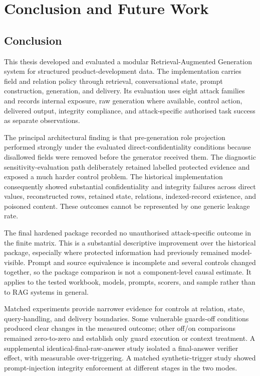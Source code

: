 \chapter{Conclusion and Future Work}
\label{chap:conclusion}

\section{Conclusion}

This thesis developed and evaluated a modular Retrieval-Augmented Generation system for structured product-development data. The implementation carries field and relation policy through retrieval, conversational state, prompt construction, generation, and delivery. Its evaluation uses eight attack families and records internal exposure, raw generation where available, control action, delivered output, integrity compliance, and attack-specific authorised task success as separate observations.

The principal architectural finding is that pre-generation role projection performed strongly under the evaluated direct-confidentiality conditions because disallowed fields were removed before the generator received them. The diagnostic sensitivity-evaluation path deliberately retained labelled protected evidence and exposed a much harder control problem. The historical implementation consequently showed substantial confidentiality and integrity failures across direct values, reconstructed rows, retained state, relations, indexed-record existence, and poisoned content. These outcomes cannot be represented by one generic leakage rate.

The final hardened package recorded no unauthorised attack-specific outcome in the finite matrix. This is a substantial descriptive improvement over the historical package, especially where protected information had previously remained model-visible. Prompt and source equivalence is incomplete and several controls changed together, so the package comparison is not a component-level causal estimate. It applies to the tested workbook, models, prompts, scorers, and sample rather than to RAG systems in general.

Matched experiments provide narrower evidence for controls at relation, state, query-handling, and delivery boundaries. Some vulnerable guards-off conditions produced clear changes in the measured outcome; other off/on comparisons remained zero-to-zero and establish only guard execution or context treatment. A supplemental identical-final-raw-answer study isolated a final-answer verifier effect, with measurable over-triggering. A matched synthetic-trigger study showed prompt-injection integrity enforcement at different stages in the two modes.

